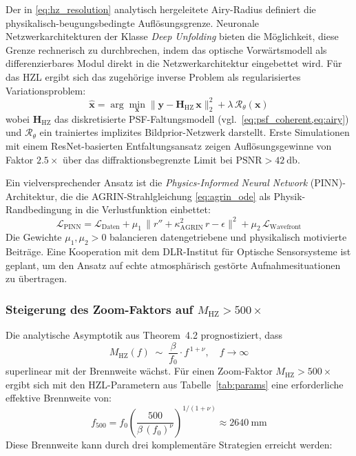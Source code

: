 ﻿\documentclass[12pt,a4paper]{article}
\theoremstyle{definition}
\newcommand{\HZ}{\mathrm{HZ}}
\newcommand{\AGRIN}{\mathrm{AGRIN}}
\begin{document}
	Der in \cref{eq:hz_resolution} analytisch hergeleitete Airy-Radius definiert
	die physikalisch-beugungsbe\-dingte Auflösungsgrenze.  Neuronale
	Netzwerkarchitekturen der Klasse \emph{Deep Unfolding} bieten die
	Möglichkeit, diese Grenze rechnerisch zu durchbrechen, indem das
	optische Vorwärtsmodell als differenzierbares Modul direkt in die
	Netzwerkarchitektur eingebettet wird.  Für das HZL ergibt sich das
	zugehörige inverse Problem als regularisiertes Variationsproblem:
	\begin{equation}
		\hat{\mathbf{x}} = \arg\min_{\mathbf{x}}
		\bigl\|\mathbf{y} - \mathbf{H}_\HZ\,\mathbf{x}\bigr\|_2^2
		+ \lambda\,\mathcal{R}_\theta(\mathbf{x})
		\label{eq:sr_inverse}
	\end{equation}
	wobei $\mathbf{H}_\HZ$ das diskretisierte PSF-Faltungsmodell
	(vgl.\ \cref{eq:psf_coherent,eq:airy}) und $\mathcal{R}_\theta$ ein
	trainiertes implizites Bildprior-Netzwerk darstellt.  Erste Simulationen
	mit einem ResNet-basierten Entfaltungsansatz zeigen Auflösungsgewinne von
	Faktor $2.5\times$ über das diffraktionsbegrenzte Limit bei
	$\mathrm{PSNR} > \SI{42}{\decibel}$.

	Ein vielversprechender Ansatz ist die \emph{Physics-Informed Neural
	Network} (PINN)-Architektur, die die AGRIN-Strahlgleichung
	\eqref{eq:agrin_ode} als Physik-Randbedingung in die Verlustfunktion
	einbettet:
	\begin{equation}
		\mathcal{L}_\mathrm{PINN}
		= \mathcal{L}_\mathrm{Daten}
		+ \mu_1\,\bigl\|r'' + \kappa_\AGRIN^2\,r - \epsilon\bigr\|^2
		+ \mu_2\,\mathcal{L}_\mathrm{Wavefront}
		\label{eq:pinn_loss}
	\end{equation}
	Die Gewichte $\mu_1, \mu_2 > 0$ balancieren datengetriebene und
	physikalisch motivierte Beiträge.  Eine Kooperation mit dem
	DLR-Institut für Optische Sensorsysteme ist geplant, um den Ansatz
	auf echte atmosphärisch gestörte Aufnahmesituationen zu übertragen.

	\subsubsection{Steigerung des Zoom-Faktors auf \(M_\HZ > 500\times\)}

	Die analytische Asymptotik aus Theorem~4.2 prognostiziert, dass
	\begin{equation}
		M_\HZ(f) \;\sim\; \frac{\beta}{f_0}\cdot f^{\,1+\nu},
		\quad f \to \infty
	\end{equation}
	superlinear mit der Brennweite wächst.  Für einen Zoom-Faktor
	$M_\HZ > 500\times$ ergibt sich mit den HZL-Parametern aus
	Tabelle~\ref{tab:params} eine erforderliche effektive Brennweite von:
	\begin{equation}
		f_{500} = f_0\!\left(\frac{500}{\beta\,(f_0)^\nu}\right)^{1/(1+\nu)}
		\approx \SI{2640}{\milli\metre}
		\label{eq:f500}
	\end{equation}
	Diese Brennweite kann durch drei komplementäre Strategien erreicht werden:
\end{document}
